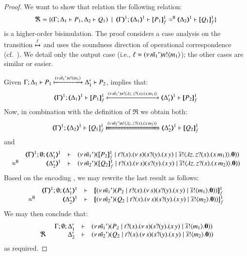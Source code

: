 \begin{proof}

	\noi We want to show that relation the following relation:
%
	\[
		\Re = \set{(\horel{\Gamma}{\Delta_1}{P_1}{,}{\Delta_2}{Q_1}) \setbar \horel{\mapt{\Gamma}^{1}}{\mapt{\Delta_1}^{1}}{\pmapp{P_1}{1}{f}}{\hwb}{\mapt{\Delta_2}^{1}}{\pmapp{Q_1}{1}{f}}}
	\]
	is a higher-order bisimulation.
%
	\noi	The proof considers a case analysis on the transition $\xmapsto{\ell}$ and
		uses the soundness direction of operational correspondence (cf.~).
		We detail only the  output case (i.e., $\ell = (\nu\, \tilde{m_1}') n ! \langle m_1 \rangle$); the other cases are similar or easier.

\bigskip

	\noi Given $\Gamma; \Delta_1 \vdash P_1 \xmapsto{(\nu\, \tilde{m_1}') n !\langle m_1 \rangle} \Delta_1' \vdash P_2$,  implies that:
%
	\[
		\horel{\mapt{\Gamma}^{1}}{\mapt{\Delta_1}^{1}}{\pmapp{P_1}{1}{f}}{\hby{\news{\tilde{m_1}'} \bactout{n}{\abs{z}{\binp{z}{x} (\appl{x}{m_1})}}}}{\mapt{\Delta_1'}^{1}}{\pmapp{P_2}{1}{f}}
	\]
%
	\noi Now, in combination with the definition of $\Re$ we obtain both:
%
	\begin{equation*}
		\horel{\mapt{\Gamma}^{1}}{\mapt{\Delta_2}^{1}}{\pmapp{Q_1}{1}{f}}{\Hby{\news{\tilde{m_2}'} \bactout{n}{\abs{z}{\binp{z}{x} (\appl{x}{m_2})}}}}{\mapt{\Delta_2'}^{1}}{\pmapp{Q_2}{1}{f}}
		\label{prop:HOp_to_HO:full_abs11}
	\end{equation*}
%
	\noi and
%
	\[
		\mhorel	{\mapt{\Gamma}^{1}}
			{\mapt{\Delta_1'}^{1}}
			{\newsp{\tilde{m_1}'}{\pmapp{P_2}{1}{f}  \Par \hotrigger{t}{x}{s}{\abs{z}{\binp{z}{x} (\appl{x}{m_1})}} }}
			{\hwb}
			{\mapt{\Delta_2'}^{1}}
			{}
			{\newsp{\tilde{m_2}'}{\pmapp{Q_2}{1}{f} \Par \hotrigger{t}{x}{s}{\abs{z}{\binp{z}{x} (\appl{x}{m_2})}}}}
	\]
	\noi Based on the encoding , we may rewrite the last result as follows:
	\[
		\mhorel{\mapt{\Gamma}^{1}}{\mapt{\Delta_1'}^{1}}{\pmapp{\newsp{\tilde{m_1}'}{P_2 
			\Par \hotrigger{t}{x}{s}{m_1}}}{1}{f}}
		{\hwb}{\mapt{\Delta_2'}^{1}}{}{\pmapp{\newsp{\tilde{m_2}'}{Q_2 \Par \hotrigger{t}{x}{s}{m_2}}}{1}{f}}
	\]
%
	\noi We may then conclude that:
$$
		\mhorel{\Gamma}{\Delta_1'}{\newsp{\tilde{m_1}'}{P_2 \Par \hotrigger{t}{x}{s}{m_1}}}
		{\ \Re\ }{\Delta_2'}{}{\newsp{\tilde{m_2}'}{Q_2 \Par \hotrigger{t}{x}{s}{m_2}}}
$$
 as required.

\bigskip



\end{proof}
